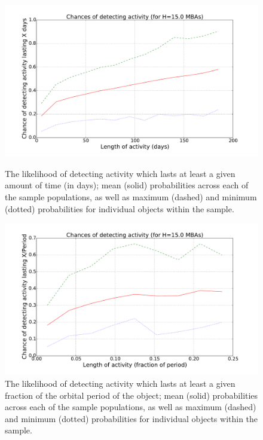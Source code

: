 \documentclass{iau}
\begin{document}
\begin{figure}[bt]
\begin{minipage}{.5\textwidth}
\begin{center}
\includegraphics[width=0.9\linewidth]{activityTime}
\captionsetup{width=0.9\linewidth}
\caption{The likelihood of detecting activity which lasts at least a
  given amount of time (in days); mean (solid)
  probabilities across each of the sample populations, as well as maximum
  (dashed) and minimum (dotted) probabilities for individual objects
  within the sample.
\label{activityTime}}
\end{center}
\end{minipage}
\begin{minipage}{.5\textwidth}
\begin{center}
\includegraphics[width=0.9\linewidth]{activityPeriod}
\captionsetup{width=0.9\linewidth}
\caption{The likelihood of detecting activity which lasts at least a
  given fraction of the orbital period of the object; mean (solid)
  probabilities across each of the sample populations, as well as maximum
  (dashed) and minimum (dotted) probabilities for individual objects
  within the sample.
\label{activityPeriod}}
\end{center}
\end{minipage}
\end{figure}
\end{document}
